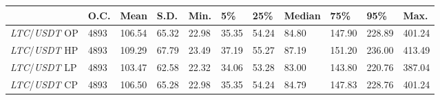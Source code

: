 \begin{tabular}{lllllllllll}
\toprule
 & \textbf{O.C.} & \textbf{Mean} & \textbf{S.D.} & \textbf{Min.} & \textbf{5\%} & \textbf{25\%} & \textbf{Median} & \textbf{75\%} & \textbf{95\%} & \textbf{Max.} \\
\midrule
\emph{LTC}/\emph{USDT} OP & 4893 & 106.54 & 65.32 & 22.98 & 35.35 & 54.24 & 84.80 & 147.90 & 228.89 & 401.24 \\
\emph{LTC}/\emph{USDT} HP & 4893 & 109.29 & 67.79 & 23.49 & 37.19 & 55.27 & 87.19 & 151.20 & 236.00 & 413.49 \\
\emph{LTC}/\emph{USDT} LP & 4893 & 103.47 & 62.58 & 22.32 & 34.06 & 53.28 & 83.00 & 143.80 & 220.76 & 387.04 \\
\emph{LTC}/\emph{USDT} CP & 4893 & 106.50 & 65.28 & 22.98 & 35.35 & 54.24 & 84.79 & 147.83 & 228.76 & 401.24 \\
\bottomrule
\end{tabular}

